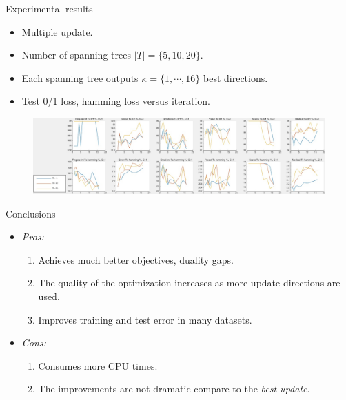 \documentclass[first=dgreen,second=purple,logo=yellowexc]{aaltoslides}
\begin{document}
\begin{frame}{Experimental results}
	\begin{itemize}\footnotesize
		\item Multiple update.
		\item Number of spanning trees $|T|=\{5,10,20\}$.
		\item Each spanning tree outputs $\kappa=\{1,\cdots,16\}$ best directions.
		\item Test 0/1 loss, hamming loss versus iteration.
	\end{itemize}
	\begin{figure}
		\begin{center}
			\includegraphics[scale=0.22]{./slide_overall_test.jpg}
		\end{center}
	\end{figure}
\end{frame}






%
\begin{frame}{Conclusions}
	\begin{itemize}\footnotesize
		\item {\em Pros:}
		\begin{enumerate}\footnotesize
			\item Achieves much better objectives, duality gaps.
			\item The quality of the optimization increases as more update directions are used.
			\item Improves training and test error in many datasets.
		\end{enumerate}
		\item {\em Cons:}
		\begin{enumerate}\footnotesize
			\item Consumes more CPU times.
			\item The improvements are not dramatic compare to the {\em best update}.
		\end{enumerate}
	\end{itemize}
\end{frame}

\end{document}
